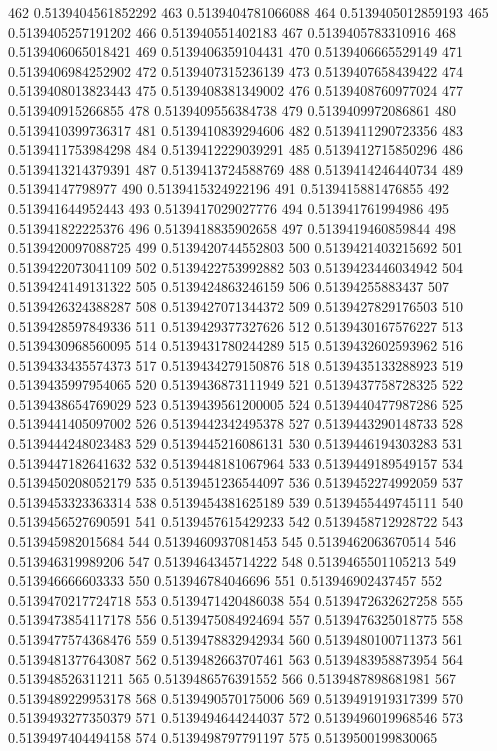 462 0.5139404561852292
463 0.5139404781066088
464 0.5139405012859193
465 0.5139405257191202
466 0.513940551402183
467 0.5139405783310916
468 0.5139406065018421
469 0.5139406359104431
470 0.5139406665529149
471 0.5139406984252902
472 0.5139407315236139
473 0.5139407658439422
474 0.5139408013823443
475 0.5139408381349002
476 0.5139408760977024
477 0.513940915266855
478 0.5139409556384738
479 0.5139409972086861
480 0.5139410399736317
481 0.5139410839294606
482 0.5139411290723356
483 0.5139411753984298
484 0.5139412229039291
485 0.5139412715850296
486 0.5139413214379391
487 0.5139413724588769
488 0.5139414246440734
489 0.51394147798977
490 0.5139415324922196
491 0.5139415881476855
492 0.513941644952443
493 0.5139417029027776
494 0.513941761994986
495 0.513941822225376
496 0.5139418835902658
497 0.5139419460859844
498 0.5139420097088725
499 0.5139420744552803
500 0.5139421403215692
501 0.5139422073041109
502 0.5139422753992882
503 0.5139423446034942
504 0.5139424149131322
505 0.5139424863246159
506 0.51394255883437
507 0.5139426324388287
508 0.5139427071344372
509 0.5139427829176503
510 0.5139428597849336
511 0.5139429377327626
512 0.5139430167576227
513 0.5139430968560095
514 0.5139431780244289
515 0.5139432602593962
516 0.5139433435574373
517 0.5139434279150876
518 0.5139435133288923
519 0.5139435997954065
520 0.5139436873111949
521 0.5139437758728325
522 0.5139438654769029
523 0.5139439561200005
524 0.5139440477987286
525 0.5139441405097002
526 0.5139442342495378
527 0.5139443290148733
528 0.5139444248023483
529 0.5139445216086131
530 0.5139446194303283
531 0.5139447182641632
532 0.5139448181067964
533 0.5139449189549157
534 0.5139450208052179
535 0.5139451236544097
536 0.5139452274992059
537 0.5139453323363314
538 0.5139454381625189
539 0.5139455449745111
540 0.5139456527690591
541 0.5139457615429233
542 0.5139458712928722
543 0.513945982015684
544 0.5139460937081453
545 0.5139462063670514
546 0.513946319989206
547 0.5139464345714222
548 0.5139465501105213
549 0.513946666603333
550 0.513946784046696
551 0.513946902437457
552 0.5139470217724718
553 0.5139471420486038
554 0.5139472632627258
555 0.5139473854117178
556 0.5139475084924694
557 0.5139476325018775
558 0.5139477574368476
559 0.5139478832942934
560 0.5139480100711373
561 0.5139481377643087
562 0.5139482663707461
563 0.5139483958873954
564 0.513948526311211
565 0.5139486576391552
566 0.5139487898681981
567 0.5139489229953178
568 0.5139490570175006
569 0.5139491919317399
570 0.5139493277350379
571 0.5139494644244037
572 0.5139496019968546
573 0.5139497404494158
574 0.5139498797791197
575 0.5139500199830065
